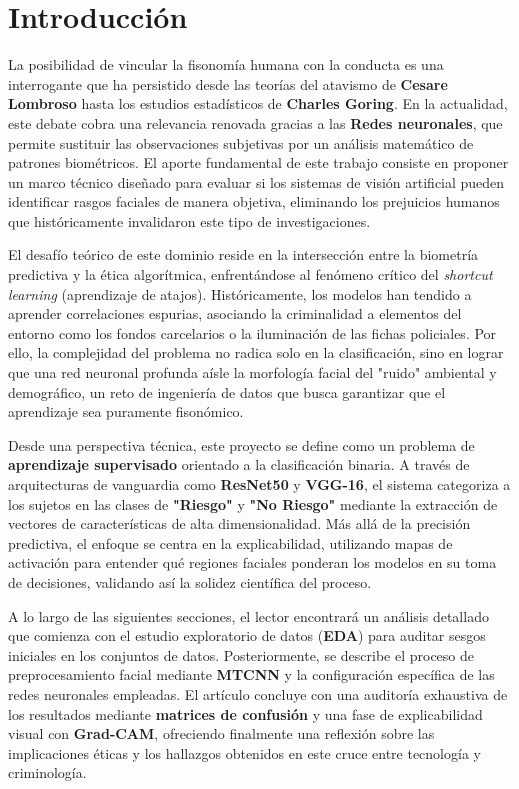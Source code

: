 \section{Introducción}

La posibilidad de vincular la fisonomía humana con la conducta es una interrogante que ha persistido desde las teorías del atavismo de \textbf{Cesare Lombroso} hasta los estudios estadísticos de \textbf{Charles Goring}. En la actualidad, este debate cobra una relevancia renovada gracias a las \textbf{Redes neuronales}, que permite sustituir las observaciones subjetivas por un análisis matemático de patrones biométricos. El aporte fundamental de este trabajo consiste en proponer un marco técnico diseñado para evaluar si los sistemas de visión artificial pueden identificar rasgos faciales de manera objetiva, eliminando los prejuicios humanos que históricamente invalidaron este tipo de investigaciones.

El desafío teórico de este dominio reside en la intersección entre la biometría predictiva y la ética algorítmica, enfrentándose al fenómeno crítico del \textit{shortcut learning} (aprendizaje de atajos). Históricamente, los modelos han tendido a aprender correlaciones espurias, asociando la criminalidad a elementos del entorno como los fondos carcelarios o la iluminación de las fichas policiales. Por ello, la complejidad del problema no radica solo en la clasificación, sino en lograr que una red neuronal profunda aísle la morfología facial del "ruido" ambiental y demográfico, un reto de ingeniería de datos que busca garantizar que el aprendizaje sea puramente fisonómico.

Desde una perspectiva técnica, este proyecto se define como un problema de \textbf{aprendizaje supervisado} orientado a la clasificación binaria. A través de arquitecturas de vanguardia como \textbf{ResNet50} y \textbf{VGG-16}, el sistema categoriza a los sujetos en las clases de \textbf{"Riesgo"} y \textbf{"No Riesgo"} mediante la extracción de vectores de características de alta dimensionalidad. Más allá de la precisión predictiva, el enfoque se centra en la explicabilidad, utilizando mapas de activación para entender qué regiones faciales ponderan los modelos en su toma de decisiones, validando así la solidez científica del proceso.

A lo largo de las siguientes secciones, el lector encontrará un análisis detallado que comienza con el estudio exploratorio de datos (\textbf{EDA}) para auditar sesgos iniciales en los conjuntos de datos. Posteriormente, se describe el proceso de preprocesamiento facial mediante \textbf{MTCNN} y la configuración específica de las redes neuronales empleadas. El artículo concluye con una auditoría exhaustiva de los resultados mediante \textbf{matrices de confusión} y una fase de explicabilidad visual con \textbf{Grad-CAM}, ofreciendo finalmente una reflexión sobre las implicaciones éticas y los hallazgos obtenidos en este cruce entre tecnología y criminología.
